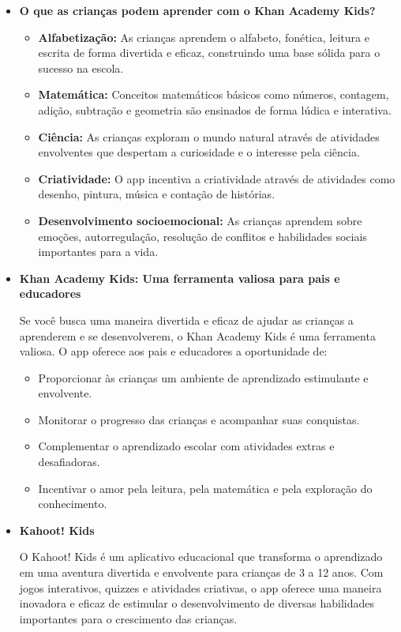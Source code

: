 \begin{itemize}
\item \textbf{O que as crianças podem aprender com o Khan Academy Kids?}

\begin{itemize}
    \item \textbf{Alfabetização:} As crianças aprendem o alfabeto, fonética, leitura e escrita de forma divertida e eficaz, construindo uma base sólida para o sucesso na escola.
    \item \textbf{Matemática:} Conceitos matemáticos básicos como números, contagem, adição, subtração e geometria são ensinados de forma lúdica e interativa.
    \item \textbf{Ciência:} As crianças exploram o mundo natural através de atividades envolventes que despertam a curiosidade e o interesse pela ciência.
    \item \textbf{Criatividade:} O app incentiva a criatividade através de atividades como desenho, pintura, música e contação de histórias.
    \item \textbf{Desenvolvimento socioemocional:} As crianças aprendem sobre emoções, autorregulação, resolução de conflitos e habilidades sociais importantes para a vida.
\end{itemize}

\item \textbf{Khan Academy Kids: Uma ferramenta valiosa para pais e educadores}

Se você busca uma maneira divertida e eficaz de ajudar as crianças a aprenderem e se desenvolverem, o Khan Academy Kids é uma ferramenta valiosa. O app oferece aos pais e educadores a oportunidade de:

\begin{itemize}
    \item Proporcionar às crianças um ambiente de aprendizado estimulante e envolvente.
    \item Monitorar o progresso das crianças e acompanhar suas conquistas.
    \item Complementar o aprendizado escolar com atividades extras e desafiadoras.
    \item Incentivar o amor pela leitura, pela matemática e pela exploração do conhecimento.
\end{itemize}

    \item \textbf{Kahoot! Kids}

    O Kahoot! Kids é um aplicativo educacional que transforma o aprendizado em uma aventura divertida e envolvente para crianças de 3 a 12 anos. Com jogos interativos, quizzes e atividades criativas, o app oferece uma maneira inovadora e eficaz de estimular o desenvolvimento de diversas habilidades importantes para o crescimento das crianças. \cite{kahoot_kids_official}


\end{itemize}
